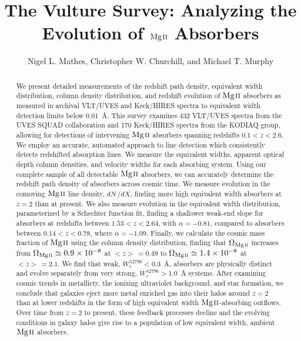 \documentclass[iop,apj,numberedappendix,appendixfloats,twocolappendix]{emulateapj}
\begin{document}
\title{The Vulture Survey: Analyzing the Evolution of ${\hbox{{\rm Mg}\kern 0.1em{\sc ii}}}$ Absorbers}

\author{
Nigel L. Mathes,
Christopher W. Churchill,
and
Michael T. Murphy
}


\begin{abstract}
We present detailed measurements of the redshift path density, equivalent width distribution, column density distribution, and redshift evolution of ${\hbox{{\rm Mg}\kern 0.1em{\sc ii}}}$ absorbers as measured in archival VLT/UVES and Keck/HIRES spectra to equivalent width detection limits below $0.01$~{\AA}. This survey examines 432 VLT/UVES spectra from the UVES SQUAD collaboration and 170 Keck/HIRES spectra from the KODIAQ group, allowing for detections of intervening ${\hbox{{\rm Mg}\kern 0.1em{\sc ii}}}$ absorbers spanning redshifts $0.1 < z < 2.6$. We employ an accurate, automated approach to line detection which consistently detects redshifted absorption lines. We measure the equivalent widths, apparent optical depth column densities, and velocity widths for each absorbing system. Using our complete sample of all detectable ${\hbox{{\rm Mg}\kern 0.1em{\sc ii}}}$ absorbers, we can accurately determine the redshift path density of absorbers across cosmic time. We measure evolution in the comoving ${\hbox{{\rm Mg}\kern 0.1em{\sc ii}}}$ line density, $dN\,/dX$, finding more high equivalent width absorbers at $z = 2$ than at present. We also measure evolution in the equivalent width distribution, parameterized by a Schechter function fit, finding a shallower weak-end slope for absorbers at redshifts between $1.53 < z < 2.64$, with $\alpha = -0.81$, compared to absorbers between $0.14 < z < 0.78$, where $\alpha = -1.09$. Finally, we calculate the cosmic mass fraction of ${\hbox{{\rm Mg}\kern 0.1em{\sc ii}}}$ using the column density distribution, finding that $\Omega_{\hbox{\scriptsize {\MgII}}}$ increases from $\Omega_{\hbox{\scriptsize {\MgII}}} \simeq 0.9\times10^{-8}$ at $<z>\,= 0.49$ to $\Omega_{\hbox{\scriptsize {\MgII}}} \simeq 1.4\times10^{-8}$ at $<z>\,= 2.1$. We find that weak, $W_r^{\lambda2796} < 0.3$~{\AA}, absorbers are physically distinct and evolve separately from very strong, $W_r^{\lambda2796} > 1.0$~{\AA} systems. After examining cosmic trends in metallicty, the ionizing ultraviolet background, and star formation, we conclude that galaxies eject more metal enriched gas into their halos around $z = 2$ than at lower redshifts in the form of high equivalent width ${\hbox{{\rm Mg}\kern 0.1em{\sc ii}}}$-absorbing outflows. Over time from $z = 2$ to present, these feedback processes decline and the evolving conditions in galaxy halos give rise to a population of low equivalent width, ambient ${\hbox{{\rm Mg}\kern 0.1em{\sc ii}}}$ absorbers. 

\end{abstract}
\end{document}
